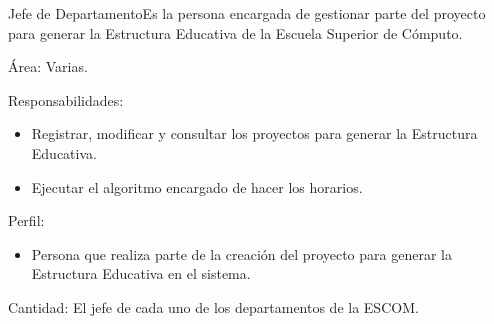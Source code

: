 \begin{actor}{Jefe de Departamento}{Es la persona encargada de gestionar parte del proyecto para generar la Estructura Educativa de la Escuela Superior de Cómputo.}
	
	\item[Área:] Varias.
	\item[Responsabilidades:] \hspace{1pt}
	\begin{itemize}
		\item Registrar, modificar y consultar los proyectos para generar la Estructura Educativa.
		
		\item Ejecutar el algoritmo encargado de hacer los horarios.
		
	\end{itemize}
	\item[Perfil:] \hspace{1pt}
	\begin{itemize}
		\item Persona que realiza parte de la creación del proyecto para generar la Estructura Educativa en el sistema.
	\end{itemize}
	\item[Cantidad:] El jefe de cada uno de los departamentos de la ESCOM.
\end{actor}


%	
%	

